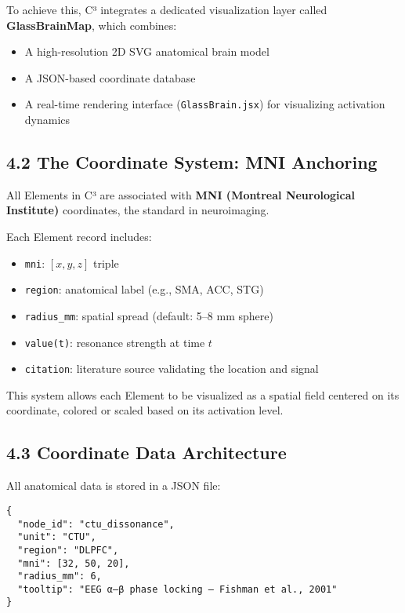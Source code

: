 \documentclass[10pt]{article}
\begin{document}
To achieve this, C³ integrates a dedicated visualization layer called \textbf{GlassBrainMap}, which combines:

\begin{itemize}
    \item A high-resolution 2D SVG anatomical brain model
    \item A JSON-based coordinate database
    \item A real-time rendering interface (\texttt{GlassBrain.jsx}) for visualizing activation dynamics
\end{itemize}

\subsection*{4.2 The Coordinate System: MNI Anchoring}

All Elements in C³ are associated with \textbf{MNI (Montreal Neurological Institute)} coordinates, the standard in neuroimaging.

Each Element record includes:

\begin{itemize}
    \item \texttt{mni}: $[x, y, z]$ triple
    \item \texttt{region}: anatomical label (e.g., SMA, ACC, STG)
    \item \texttt{radius\_mm}: spatial spread (default: 5–8 mm sphere)
    \item \texttt{value(t)}: resonance strength at time $t$
    \item \texttt{citation}: literature source validating the location and signal
\end{itemize}

This system allows each Element to be visualized as a spatial field centered on its coordinate, colored or scaled based on its activation level.

\subsection*{4.3 Coordinate Data Architecture}

All anatomical data is stored in a JSON file:

\begin{verbatim}
{
  "node_id": "ctu_dissonance",
  "unit": "CTU",
  "region": "DLPFC",
  "mni": [32, 50, 20],
  "radius_mm": 6,
  "tooltip": "EEG α–β phase locking – Fishman et al., 2001"
}
\end{verbatim}
\end{document}
